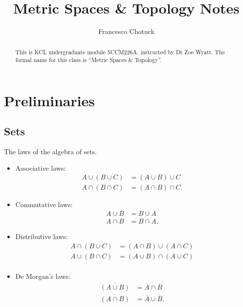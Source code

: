 \documentclass[12pt, a4paper]{article}
\title{Metric Spaces \& Topology Notes}
\date{}
\author{Francesco Chotuck}
\begin{document}
\maketitle

\begin{abstract}
    This is KCL undergraduate module 5CCM226A, instructed by Dr Zoe Wyatt. The formal name for this class is ``Metric Spaces \& Topology''.
\end{abstract}

\tableofcontents

\pagebreak

\section{Preliminaries}

\subsection{Sets}

\begin{mdthm}
    The laws of the algebra of sets.
    \begin{itemize}
        \item Associative laws:
        \[\begin{aligned}
            A \cup (B \cup C) &= (A \cup B) \cup C \\
            A \cap (B \cap C) &= (A \cap B) \cap C.
        \end{aligned}\]
        \item Commutative laws:
        \[\begin{aligned}
            A \cup B &= B \cup A \\
            A \cap B &= B \cap A.
        \end{aligned}\]
        \item Distributive laws:
        \[\begin{aligned}
            A \cap (B \cup C) &= (A \cap B) \cup (A \cap C) \\
            A \cup (B \cap C) &= (A \cup B) \cap (A \cup C) \\
        \end{aligned}\]
        \item De Morgan's laws:
        \[\begin{aligned}
            \overline{(A \cup B)} &= \overline{A} \cap \overline{B} \\
            \overline{(A \cap B)} &= \overline{A} \cup \overline{B}.
        \end{aligned}\]
    \end{itemize}
\end{mdthm}
\end{document}
